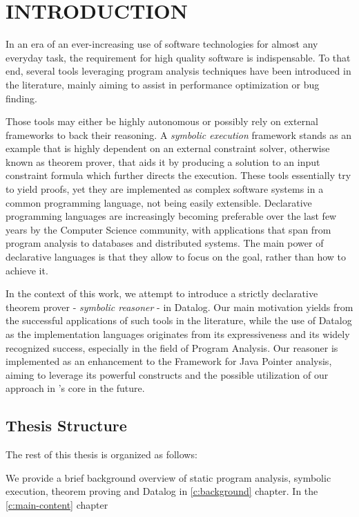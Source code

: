 
\chapter{INTRODUCTION}\label{c:introduction}

In an era of an ever-increasing use of software technologies
for almost any everyday task, the requirement for high quality software is indispensable. To
 that end, several tools leveraging program analysis techniques have been
introduced in the literature, mainly aiming to assist in performance optimization or bug finding.

Those tools may either be highly autonomous or possibly rely on external frameworks to back their reasoning.
A \emph{symbolic execution} framework stands as an example that is highly dependent on an
external constraint solver, otherwise known as theorem prover, that aids it by producing a solution to an input
constraint formula which further directs the execution. These tools essentially try to yield proofs, yet they
are implemented as complex software systems in a common programming language, not being easily extensible.
Declarative programming languages are increasingly becoming preferable over the last few years by
the Computer Science community, with applications that span from program analysis to databases and distributed
systems. The main power of declarative languages is that they allow to focus on the goal, rather than
how to achieve it.

In the context of this work, we attempt to introduce a strictly declarative theorem prover - \emph{symbolic reasoner} -
in Datalog. Our main motivation yields from the successful applications of such tools in the literature, while
the use of Datalog as the implementation languages originates from its expressiveness and its widely recognized
success, especially in the field of Program Analysis. Our reasoner is implemented as an enhancement to the
\doop{} Framework for Java Pointer analysis, aiming to leverage its powerful constructs and the possible
utilization of our approach in \doop{}'s core in the future.

\section{Thesis Structure}\label{s:structure}

The rest of this thesis is organized as follows:

We provide a brief background overview of static program analysis, symbolic execution,
theorem proving and Datalog in \ref{c:background} chapter. In the \ref{c:main-content}
chapter

